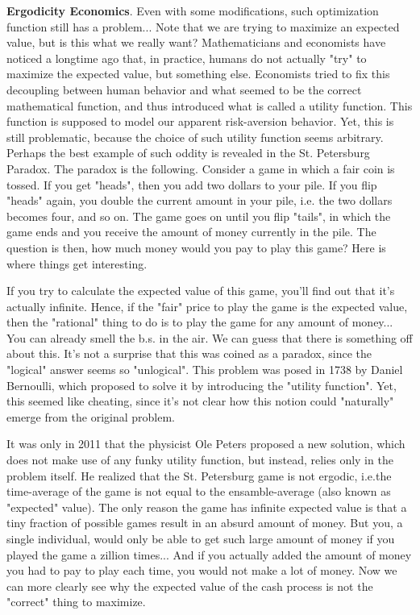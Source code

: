 \begin{shaded}
\textbf{Ergodicity Economics}.
Even with some modifications, such optimization function still has a problem...
Note that we are trying to
maximize an expected value, but is this what we really want?
Mathematicians and economists have noticed a longtime ago that, in practice,
humans do not actually "try" to maximize the expected value, but something else.
Economists tried to fix this decoupling between human behavior and what seemed to
be the correct mathematical function, and thus introduced what is called a utility function.
This function is supposed to model our apparent risk-aversion behavior.
Yet, this is still problematic, because the choice of such utility function seems arbitrary.
Perhaps the best example of such oddity is revealed in the St. Petersburg Paradox.
The paradox is the following. Consider a game in which a fair coin is tossed.
If you get "heads", then you add two dollars to your pile. If you flip "heads" again,
you double the current amount in your pile, i.e. the two dollars becomes four, and so on.
The game goes on until you flip "tails", in which the game ends and you receive the amount
of money currently in the pile.
The question is then, how much money would you pay to play this game?
Here is where things get interesting.

If you try to
calculate the expected value of this game, you'll find out that it's actually infinite.
Hence, if the "fair" price to play the game
is the expected value, then the "rational" thing to do is to play the game
for any amount of money... You can already smell the b.s. in the air.
We can guess that there is something off about this. It's not a surprise that this was
coined as a paradox, since the "logical" answer seems so "unlogical".
This problem was posed in 1738 by Daniel Bernoulli, which
proposed to solve it by introducing the "utility function".
Yet, this seemed like cheating, since it's not clear how this notion
could "naturally" emerge from the original problem.

It was only in 2011 that the physicist Ole Peters proposed a new solution,
which does not make use of any funky utility function, but instead,
relies only in the problem itself. He realized that the St. Petersburg game
is not ergodic, i.e.the time-average of the game is not equal to the ensamble-average
(also known as "expected" value). The only reason the game has infinite expected value
is that a tiny fraction of possible games
result in an absurd amount of money. But you, a single individual,
would only be able to get such
large amount of money if you played the game a zillion times...
And if you actually added the amount of money
you had to pay to play each time, you would not make a lot of money.
Now we can more clearly see why the expected value of the cash process is not the "correct" thing to maximize.
\end{shaded}

